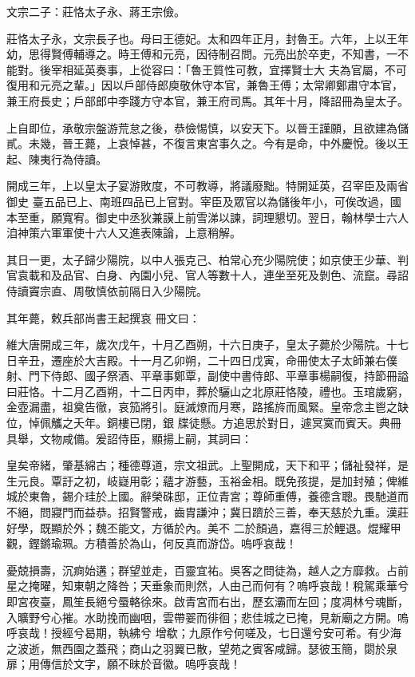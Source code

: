 \begin{pinyinscope}
 文宗二子：莊恪太子永、蔣王宗儉。



 莊恪太子永，文宗長子也。母曰王德妃。太和四年正月，封魯王。六年，上以王年幼，思得賢傅輔導之。時王傅和元亮，因待制召問。元亮出於卒吏，不知書，一不能對。後宰相延英奏事，上從容曰：「魯王質性可教，宜擇賢士大
 夫為官屬，不可復用和元亮之輩。」因以戶部侍郎庾敬休守本官，兼魯王傅；太常卿鄭肅守本官，兼王府長史；戶部郎中李踐方守本官，兼王府司馬。其年十月，降詔冊為皇太子。



 上自即位，承敬宗盤游荒怠之後，恭儉惕慎，以安天下。以晉王謹願，且欲建為儲貳。未幾，晉王薨，上哀悼甚，不復言東宮事久之。今有是命，中外慶悅。後以王起、陳夷行為侍讀。



 開成三年，上以皇太子宴游敗度，不可教導，將議廢黜。特開延英，召宰臣及兩省御史
 臺五品已上、南班四品已上官對。宰臣及眾官以為儲後年小，可俟改過，國本至重，願寬宥。御史中丞狄兼謨上前雪涕以諫，詞理懇切。翌日，翰林學士六人洎神策六軍軍使十六人又進表陳論，上意稍解。



 其日一更，太子歸少陽院，以中人張克己、柏常心充少陽院使；如京使王少華、判官袁載和及品官、白身、內園小兒、官人等數十人，連坐至死及剝色、流竄。尋詔侍讀竇宗直、周敬慎依前隔日入少陽院。



 其年薨，敕兵部尚書王起撰哀
 冊文曰：



 維大唐開成三年，歲次戊午，十月乙酉朔，十六日庚子，皇太子薨於少陽院。十七日辛丑，遷座於大吉殿。十一月乙卯朔，二十四日戊寅，命冊使太子太師兼右僕射、門下侍郎、國子祭酒、平章事鄭覃，副使中書侍郎、平章事楊嗣復，持節冊謚曰莊恪。十二月乙酉朔，十二日丙申，葬於驪山之北原莊恪陵，禮也。玉琯歲窮，金壺漏盡，祖奠告徹，哀笳將引。庭滅燎而月寒，路搖旍而風緊。皇帝念主鬯之缺位，悼佩觿之夭年。銅樓已閉，銀
 牒徒懸。方追思於對日，遽冥寞而賓天。典冊具舉，文物咸備。爰詔侍臣，顯揚上嗣，其詞曰：



 皇矣帝緒，肇基綿古；種德尊道，宗文祖武。上聖開成，天下和平；儲祉發祥，是生元良。覃訏之初，岐嶷用彰；蘊才游藝，玉裕金相。既免孩提，是加封殖；俾維城於東魯，錫介珪於上國。辭榮硃邸，正位青宮；尊師重傅，養德含聰。畏馳道而不絕，問寢門而益恭。招賢警戒，齒胄謙沖；冀日躋於三善，奉天慈於九重。漢莊好學，既顯於外；魏丕能文，方循於內。美不
 二於顏過，嘉得三於鯉退。焜耀甲觀，鏗鏘瑜珮。方積善於為山，何反真而游岱。嗚呼哀哉！



 憂兢損壽，沉痾始遘；群望並走，百靈宜祐。吳客之問徒為，越人之方靡救。占前星之掩曜，知東朝之降咎；天垂象而則然，人由己而何有？嗚呼哀哉！稅駕乘華兮即宮夜臺，鳳笙長絕兮蜃輅徐來。啟青宮而右出，歷玄灞而左回；度凋林兮魂斷，入曠野兮心摧。水助挽而幽咽，雲帶翣而徘徊；悲佳城之已掩，見新廟之方開。嗚呼哀哉！授經兮曷期，執紼兮
 增欷；九原作兮何嗟及，七日還兮安可希。有少海之波逝，無西園之蓋飛；商山之羽翼已散，望苑之賓客咸歸。瑟彼玉簡，閟於泉扉；用傳信於文字，願不昧於音徽。嗚呼哀哉！




\end{pinyinscope}
